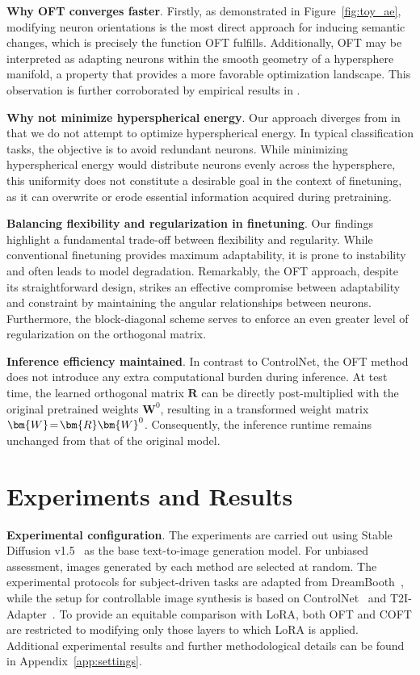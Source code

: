 \textbf{Why OFT converges faster}. Firstly, as demonstrated in Figure~\ref{fig:toy_ae}, modifying neuron orientations is the most direct approach for inducing semantic changes, which is precisely the function OFT fulfills. Additionally, OFT may be interpreted as adapting neurons within the smooth geometry of a hypersphere manifold, a property that provides a more favorable optimization landscape. This observation is further corroborated by empirical results in \cite{liu2021orthogonal}.

\textbf{Why not minimize hyperspherical energy}. Our approach diverges from \cite{liu2021orthogonal} in that we do not attempt to optimize hyperspherical energy. In typical classification tasks, the objective is to avoid redundant neurons. While minimizing hyperspherical energy would distribute neurons evenly across the hypersphere, this uniformity does not constitute a desirable goal in the context of finetuning, as it can overwrite or erode essential information acquired during pretraining.

\textbf{Balancing flexibility and regularization in finetuning}. Our findings highlight a fundamental trade-off between flexibility and regularity. While conventional finetuning provides maximum adaptability, it is prone to instability and often leads to model degradation. Remarkably, the OFT approach, despite its straightforward design, strikes an effective compromise between adaptability and constraint by maintaining the angular relationships between neurons. Furthermore, the block-diagonal scheme serves to enforce an even greater level of regularization on the orthogonal matrix.

\textbf{Inference efficiency maintained}. In contrast to ControlNet, the OFT method does not introduce any extra computational burden during inference. At test time, the learned orthogonal matrix $\bm{R}$ can be directly post-multiplied with the original pretrained weights $\bm{W}^0$, resulting in a transformed weight matrix $\thickmuskip=2mu \medmuskip=2mu \bm{W}=\bm{R}\bm{W}^0$. Consequently, the inference runtime remains unchanged from that of the original model.

\section{Experiments and Results}

\textbf{Experimental configuration}. The experiments are carried out using Stable Diffusion v1.5~\cite{rombach2022high} as the base text-to-image generation model. For unbiased assessment, images generated by each method are selected at random. The experimental protocols for subject-driven tasks are adapted from DreamBooth~\cite{ruiz2023dreambooth}, while the setup for controllable image synthesis is based on ControlNet~\cite{zhang2023adding} and T2I-Adapter~\cite{mou2023t2i}. To provide an equitable comparison with LoRA, both OFT and COFT are restricted to modifying only those layers to which LoRA is applied. Additional experimental results and further methodological details can be found in Appendix~\ref{app:settings}.

